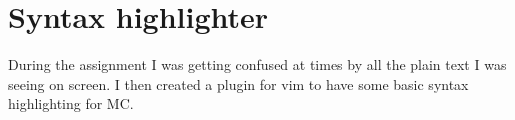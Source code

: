 \chapter{Syntax highlighter}
During the assignment I was getting confused at times by all the plain text I was seeing on screen.
I then created a plugin for vim to have some basic syntax highlighting for MC.


